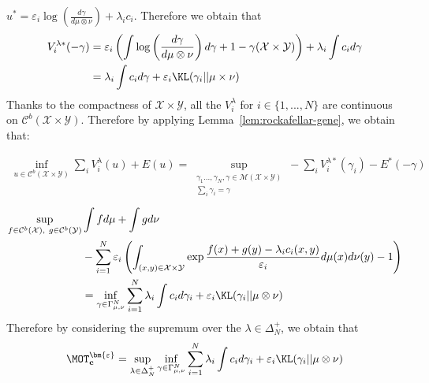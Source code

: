 \begin{prv*}
$u^*=\varepsilon_i \log\left(\frac{d\gamma}{d\mu\otimes\nu}\right)+\lambda_i c_i$. Therefore we obtain that
\begin{align*}
 V^{\lambda*}_i(-\gamma)&=\varepsilon_i\left(\int \log\left(\frac{d\gamma}{d\mu\otimes\nu}\right)d\gamma +1- \gamma(\mathcal{X}\times\mathcal{Y})\right)+\lambda_i\int c_i d\gamma\\
 &=\lambda_i\int c_id\gamma+\varepsilon_i\KL(\gamma_i||\mu\times\nu)
\end{align*}   
Thanks to the compactness of $\mathcal{X}\times\mathcal{Y}$, all the $V_i^{\lambda}$ for $i\in\{1,...,N\}$ are continuous on $\mathcal{C}^b(\mathcal{X}\times\mathcal{Y})$. Therefore by applying Lemma~\ref{lem:rockafellar-gene}, we obtain that:

\begin{align*}
\inf_{u\in \mathcal{C}^b(\mathcal{X}\times\mathcal{Y})} \sum_i V_i^{\lambda}(u) + E(u) = \sup\limits_{\substack{\gamma_1...,\gamma_N,\gamma\in \mathcal{M}(\mathcal{X}\times\mathcal{Y})\\\sum_i \gamma_i = \gamma}}-\sum_i V_i^{\lambda*}(\gamma_i)-E^*(-\gamma)
\end{align*}
\begin{align*}
\sup\limits_{f\in \mathcal{C}^b(\mathcal{X}),~g\in\mathcal{C}^b(\mathcal{Y})}&\int fd\mu+\int gd\nu \\
& - \sum_{i=1}^N \varepsilon_i\left(\int_{(x,y)\in\mathcal{X}\times\mathcal{Y}} \exp{\frac{f(x)+g(y)-\lambda_ic_i(x,y)}{\varepsilon_i}}d\mu(x)d\nu(y)-1\right)\\
&= \inf_{\gamma\in\Gamma^N_{\mu,\nu}} \sum_{i=1}^N \lambda_i\int c_i d\gamma_i + \varepsilon_i\KL(\gamma_i||\mu\otimes\nu)
\end{align*}
Therefore by considering the supremum over the $\lambda\in\Delta_N^{+}$, we obtain that
\begin{align*}
    \MOT_{\mathbf{c}}^{\bm{\varepsilon}}=\sup_{\lambda\in\Delta_N^{+}}\inf_{\gamma\in\Gamma^N_{\mu,\nu}} \sum_{i=1}^N \lambda_i\int c_i d\gamma_i + \varepsilon_i \KL(\gamma_i||\mu\otimes\nu)
\end{align*}



\end{prv*}
